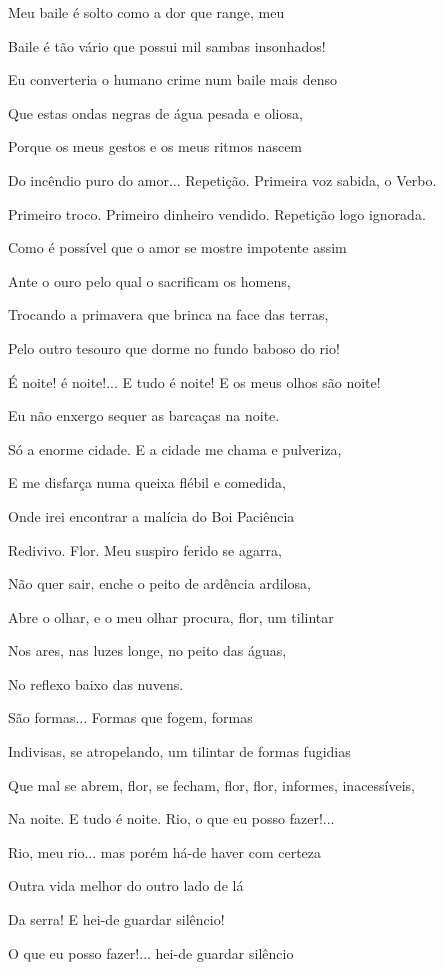 Meu baile é solto como a dor que range, meu

Baile é tão vário que possui mil sambas insonhados!

Eu converteria o humano crime num baile mais denso

Que estas ondas negras de água pesada e oliosa,

Porque os meus gestos e os meus ritmos nascem

Do incêndio puro do amor... Repetição. Primeira voz sabida, o Verbo.

Primeiro troco. Primeiro dinheiro vendido. Repetição logo ignorada.

Como é possível que o amor se mostre impotente assim

Ante o ouro pelo qual o sacrificam os homens,

Trocando a primavera que brinca na face das terras,

Pelo outro tesouro que dorme no fundo baboso do rio!

É noite! é noite!... E tudo é noite! E os meus olhos são noite!

Eu não enxergo sequer as barcaças na noite.

Só a enorme cidade. E a cidade me chama e pulveriza,

E me disfarça numa queixa flébil e comedida,

Onde irei encontrar a malícia do Boi Paciência

Redivivo. Flor. Meu suspiro ferido se agarra,

Não quer sair, enche o peito de ardência ardilosa,

Abre o olhar, e o meu olhar procura, flor, um tilintar

Nos ares, nas luzes longe, no peito das águas,

No reflexo baixo das nuvens.

São formas... Formas que fogem, formas

Indivisas, se atropelando, um tilintar de formas fugidias

Que mal se abrem, flor, se fecham, flor, flor, informes, inacessíveis,

Na noite. E tudo é noite. Rio, o que eu posso fazer!...

Rio, meu rio... mas porém há-de haver com certeza

Outra vida melhor do outro lado de lá

Da serra! E hei-de guardar silêncio!

O que eu posso fazer!... hei-de guardar silêncio

